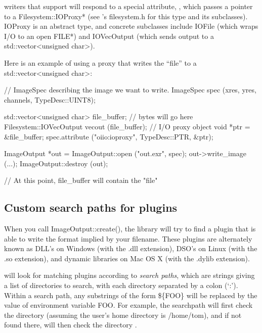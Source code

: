 \ImageOutput writers that support  will respond to a special
attribute, , which passes a pointer to a {\cf
Filesystem::IOProxy*} (see \product's {\cf filesystem.h} for this type and
its subclasses). {\cf IOProxy} is an abstract type, and concrete subclasses
include {\cf IOFile} (which wraps I/O to an open {\cf FILE*}) and {\cf
IOVecOutput} (which sends output to a {\cf std::vector<unsigned char>}).

Here is an example of using a proxy that writes the ``file'' to a
{\cf std::vector<unsigned char>}:

\begin{code}
    // ImageSpec describing the image we want to write.
    ImageSpec spec (xres, yres, channels, TypeDesc::UINT8);

    std::vector<unsigned char> file_buffer;  // bytes will go here
    Filesystem::IOVecOutput vecout (file_buffer);  // I/O proxy object
    void *ptr = &file_buffer;
    spec.attribute ("oiio:ioproxy", TypeDesc::PTR, &ptr);

    ImageOutput *out = ImageOutput::open ("out.exr", spec);
    out->write_image (...);
    ImageOutput::destroy (out);

    // At this point, file_buffer will contain the "file"
\end{code}



\subsection{Custom search paths for plugins}
\label{sec:imageoutput:searchpaths}

When you call {\cf ImageOutput::create()}, the \product library will try
to find a plugin that is able to write the format implied by your
filename.  These plugins are alternately known as DLL's on Windows (with
the {\cf .dll} extension), DSO's on Linux (with the {\cf .so}
extension), and dynamic libraries on Mac OS X (with the {\cf .dylib}
extension).  

\product will look for matching plugins according to
\emph{search paths}, which are strings giving a list of directories to
search, with each directory separated by a colon (`{\cf :}').  Within
a search path, any
substrings of the form {\cf \$\{FOO\}} will be replaced
by the value of environment variable {\cf FOO}.  For
example, the searchpath 
will first check the directory  (assuming the
user's home directory is {\cf /home/tom}), and if not
found there, will then check the directory .

